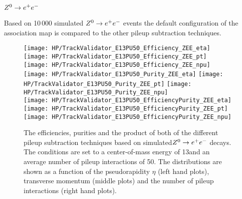 \subsubsection{$\Zz\rightarrow\EE$}

Based on 10\,000 simulated  $\Zz\rightarrow\EE$ events the default configuration of the association map is compared to the other pileup subtraction techniques.

\begin{figure}[!h]
  \centering
  \texttt{[image: HP/TrackValidator\_E13PU50\_Efficiency\_ZEE\_eta]}
  \texttt{[image: HP/TrackValidator\_E13PU50\_Efficiency\_ZEE\_pt]}
  \texttt{[image: HP/TrackValidator\_E13PU50\_Efficiency\_ZEE\_npu]}
   \\
  \texttt{[image: HP/TrackValidator\_E13PU50\_Purity\_ZEE\_eta]}
  \texttt{[image: HP/TrackValidator\_E13PU50\_Purity\_ZEE\_pt]}
  \texttt{[image: HP/TrackValidator\_E13PU50\_Purity\_ZEE\_npu]}
   \\
  \texttt{[image: HP/TrackValidator\_E13PU50\_EfficiencyPurity\_ZEE\_eta]}
  \texttt{[image: HP/TrackValidator\_E13PU50\_EfficiencyPurity\_ZEE\_pt]}
  \texttt{[image: HP/TrackValidator\_E13PU50\_EfficiencyPurity\_ZEE\_npu]}
  \caption[Efficiencies, purities and their product of the different pileup subtraction techniques based $\Zz\rightarrow\EE$ decays with 13\TeV and $\left<PU\right>=50$]{The efficiencies, purities and the product of both of the different pileup subtraction techniques based on simulated$\Zz\rightarrow\EE$ decays. The conditions are set to a center-of-mass energy of 13\TeV and an average number of pileup interactions of 50. The distributions are shown as a function of the pseudorapidity $\eta$ (left hand plots), transverse momentum (middle plots) and the number of pileup interactions (right hand plots).}
\end{figure}
\clearpage

